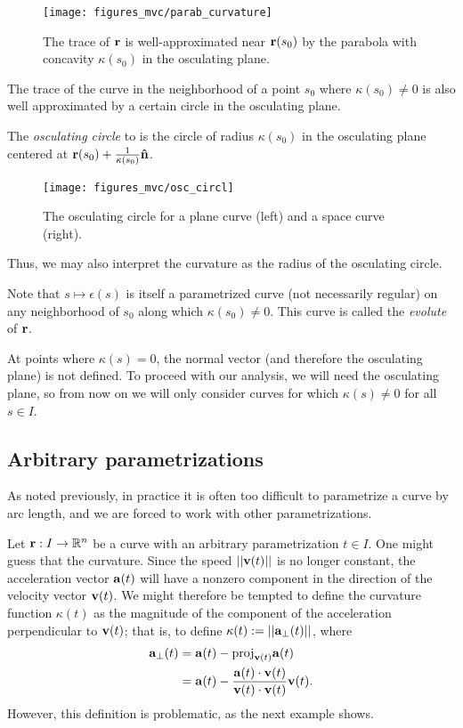 \documentclass[12pt,letterpaper,reqno]{article}
\numberwithin{equation}{section}
\newcommand{\R}{\ensuremath{\mathbb R}}
\newcommand{\bv}{{\bf v}}
\newcommand{\ba}{{\bf a}}
\newcommand{\bbr}{{\bf r}}
\newcommand{\un}{{\bf {\hat{n}}}}
\newcommand{\fixme}[1]{{\color{orange}{[#1]}}}
\begin{document}
{\begin{figure}[h]
	\begin{center}
		\texttt{[image: figures\_mvc/parab\_curvature]}
	\end{center}
	\caption{The trace of $\bbr$ is well-approximated near $\bbr(s_0)$ by the parabola with concavity $\kappa(s_0)$ in the osculating plane.}
\end{figure}

\newpage 
The trace of the curve in the neighborhood of a point $s_0$ where $\kappa(s_0) \neq 0$ is also well approximated by a certain circle in the osculating plane. 

\begin{defn}
	The \emph{osculating circle} to is the circle of radius $\kappa(s_0)$ in the osculating plane centered at $\bbr(s_0)+\frac{1}{\kappa(s_0)}\un$.
\end{defn}

\begin{figure}[h]
	\begin{center}
		\texttt{[image: figures\_mvc/osc\_circl]}
	\end{center}
	\caption{The osculating circle for a plane curve (left) and a space curve (right).}
\end{figure}
Thus, we may also interpret the curvature as the radius of the osculating circle. \fixme{Add Exercise 1.42?}

Note that $s \mapsto \epsilon(s)$ is itself a parametrized curve (not necessarily regular) on any neighborhood of $s_0$ along which $\kappa(s_0) \neq 0$. This curve is called the \emph{evolute} of $\bbr$.

At points where $\kappa(s)=0$, the normal vector (and therefore the osculating plane) is not defined. To proceed with our analysis, we will need the osculating plane, so from now on we will only consider curves for which $\kappa(s) \neq 0$ for all $s \in I$.

\subsection{Arbitrary parametrizations}
As noted previously, in practice it is often too difficult to parametrize a curve by arc length, and we are forced to work with other parametrizations.

Let $\bbr:I \to \R^n$ be a curve with an arbitrary parametrization $t \in I$. One might guess that the curvature. Since the speed $||\bv(t)||$ is no longer constant, the acceleration vector $\ba(t)$ will have a nonzero component in the direction of the velocity vector $\bv(t)$. We might therefore be tempted to define the curvature function $\kappa(t)$ as the magnitude of the component of the acceleration perpendicular to $\bv(t)$; that is, to define $\kappa(t):=||\ba_\perp(t)||$, where
\begin{align*}
	\ba_\perp(t)&=\ba(t)-\text{proj}_{\bv(t)}\ba(t) \\
	&=\ba(t)-\frac{\ba(t)\cdot \bv(t)}{\bv(t)\cdot \bv(t)}\bv(t). 
\end{align*}
 However, this definition is problematic, as the next example shows.

}
\end{document}
